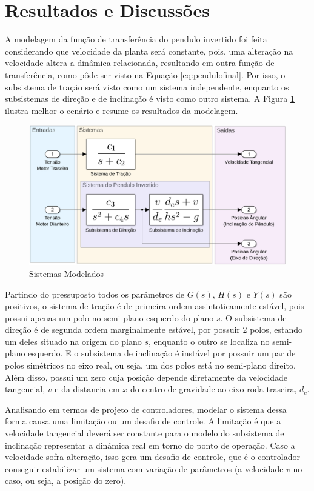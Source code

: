     \section{Resultados e Discussões}

        A modelagem da função de transferência do pendulo invertido foi feita considerando que velocidade da planta será constante, pois, uma alteração na velocidade altera a dinâmica relacionada, resultando em outra função de transferência, como pôde ser visto na Equação \eqref{eq:pendulofinal}. Por isso, o subsistema de tração será visto como um sistema independente, enquanto os subsistemas de direção e de inclinação é visto como outro sistema. A Figura \ref{img:ModelagemFinal} ilustra melhor o cenário e resume os resultados da modelagem.
        
        \begin{figure}[h]
            \centering
            \includegraphics[width=15cm]{Imagens/sistemasFINAL.png}
            \caption{Sistemas Modelados}
            \label{img:ModelagemFinal}
        \end{figure}
        
        Partindo do pressuposto todos os parâmetros de $G(s)$, $H(s)$ e $Y(s)$ são positivos, o sistema de tração é de primeira ordem assintoticamente estável, pois possui apenas um polo no semi-plano esquerdo do plano $s$. O subsistema de direção é de segunda ordem marginalmente estável, por possuir 2 polos, estando um deles situado na origem do plano $s$, enquanto o outro se localiza no semi-plano esquerdo. E o subsistema de inclinação é instável por possuir um par de polos simétricos no eixo real, ou seja, um dos polos está no semi-plano direito. Além disso, possui um zero cuja posição depende diretamente da velocidade tangencial, $v$ e da distancia em $x$ do centro de gravidade ao eixo roda traseira, $d_c$.
        
        Analisando em termos de projeto de controladores, modelar o sistema dessa forma causa uma limitação ou um desafio de controle. A limitação é que a velocidade tangencial deverá ser constante para o modelo do subsistema de inclinação representar a dinâmica real em torno do ponto de operação. Caso a velocidade sofra alteração, isso gera um desafio de controle, que é o controlador conseguir estabilizar um sistema com variação de parâmetros (a velocidade $v$ no caso, ou seja, a posição do zero).